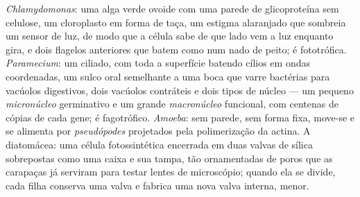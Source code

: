 \begin{example}\label{ex:b2:unicellular-diversity:four}
\emph{Chlamydomonas}: uma alga verde ovoide com uma parede de
glicoproteína sem celulose, um cloroplasto em forma de taça, um
estigma alaranjado que sombreia um sensor de luz, de modo que a célula
sabe de que lado vem a luz enquanto gira, e dois flagelos anteriores
que batem como num nado de peito; é fototrófica.
\emph{Paramecium}: um ciliado, com toda a superfície batendo cílios em
ondas coordenadas, um sulco oral semelhante a uma boca que varre
bactérias para vacúolos digestivos, dois vacúolos contráteis e dois
tipos de núcleo --- um pequeno \emph{micronúcleo} germinativo e um
grande \emph{macronúcleo} funcional, com centenas de cópias de cada
gene; é fagotrófico. \emph{Amoeba}: sem parede, sem forma fixa, move-se
e se alimenta por \emph{pseudópodes} projetados pela polimerização da
actina. A diatomácea: uma célula fotossintética encerrada em duas
valvas de sílica sobrepostas como uma caixa e sua tampa, tão
ornamentadas de poros que as carapaças já serviram para testar
lentes de microscópio; quando ela se divide, cada filha conserva uma
valva e fabrica uma nova valva interna, menor.
\end{example}

